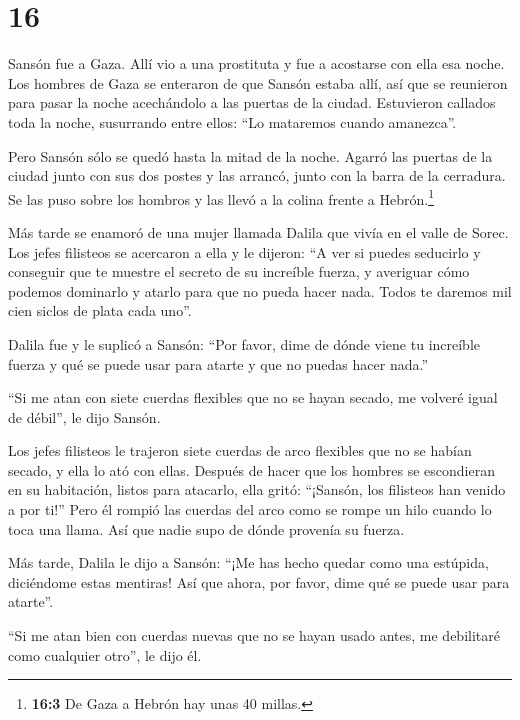 \hypertarget{section-15}{%
\section{16}\label{section-15}}

 Sansón fue a Gaza. Allí vio a una prostituta y fue a
acostarse con ella esa noche.  Los hombres de Gaza se
enteraron de que Sansón estaba allí, así que se reunieron para pasar la
noche acechándolo a las puertas de la ciudad. Estuvieron callados toda
la noche, susurrando entre ellos: ``Lo mataremos cuando amanezca''.

 Pero Sansón sólo se quedó hasta la mitad de la noche.
Agarró las puertas de la ciudad junto con sus dos postes y las arrancó,
junto con la barra de la cerradura. Se las puso sobre los hombros y las
llevó a la colina frente a Hebrón.\footnote{\textbf{16:3} De Gaza a
  Hebrón hay unas 40 millas.}

 Más tarde se enamoró de una mujer llamada Dalila que vivía
en el valle de Sorec.  Los jefes filisteos se acercaron a
ella y le dijeron: ``A ver si puedes seducirlo y conseguir que te
muestre el secreto de su increíble fuerza, y averiguar cómo podemos
dominarlo y atarlo para que no pueda hacer nada. Todos te daremos mil
cien siclos de plata cada uno''.

 Dalila fue y le suplicó a Sansón: ``Por favor, dime de
dónde viene tu increíble fuerza y qué se puede usar para atarte y que no
puedas hacer nada.''

 ``Si me atan con siete cuerdas flexibles que no se hayan
secado, me volveré igual de débil'', le dijo Sansón.

 Los jefes filisteos le trajeron siete cuerdas de arco
flexibles que no se habían secado, y ella lo ató con ellas. 
Después de hacer que los hombres se escondieran en su habitación, listos
para atacarlo, ella gritó: ``¡Sansón, los filisteos han venido a por
ti!'' Pero él rompió las cuerdas del arco como se rompe un hilo cuando
lo toca una llama. Así que nadie supo de dónde provenía su fuerza.

 Más tarde, Dalila le dijo a Sansón: ``¡Me has hecho quedar
como una estúpida, diciéndome estas mentiras! Así que ahora, por favor,
dime qué se puede usar para atarte''.

 ``Si me atan bien con cuerdas nuevas que no se hayan usado
antes, me debilitaré como cualquier otro'', le dijo él.


